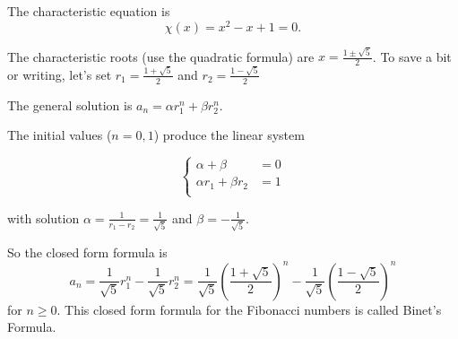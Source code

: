 \begin{Solution}{36.9}


The characteristic equation is 
\[
\chi(x) = x^{2} - x +1 =0.
\] 

The characteristic roots  (use the quadratic formula) are $x = \frac{1\pm\sqrt{5}}{2}$.
To save a bit or writing, let's set $r_{1} = \frac{1+\sqrt{5}}{2}$ and $r_{2} = \frac{1-\sqrt{5}}{2}$

The general solution is $a_{n}=\alpha r_{1}^{n} + \beta r_{2}^{n}$.

The initial values ($n = 0,1$)  produce the linear system

\[
  \left\{
    \begin{aligned}
     \alpha + \beta &= 0\\
     \alpha r_{1} + \beta r_{2} &= 1\\
     \end{aligned}
   \right.
\]
   
with solution $\alpha = \frac{1}{r_{1}-r_{2}}= \frac{1}{\sqrt{5}}$ and $\beta = -\frac{1}{\sqrt{5}}$.

So the closed form formula is 
\[
a_{n} = \frac{1}{\sqrt{5}}r_{1}^{n}-\frac{1}{\sqrt{5}}r_{2}^{n}= \frac{1}{\sqrt{5}}\left( \frac{1+\sqrt{5}}{2}\right)^{n}-\frac{1}{\sqrt{5}}\left( \frac{1-\sqrt{5}}{2} \right)^{n}
\]   
for $n\geq 0$. This closed form formula for the Fibonacci numbers is called Binet's Formula.




\end{Solution}

